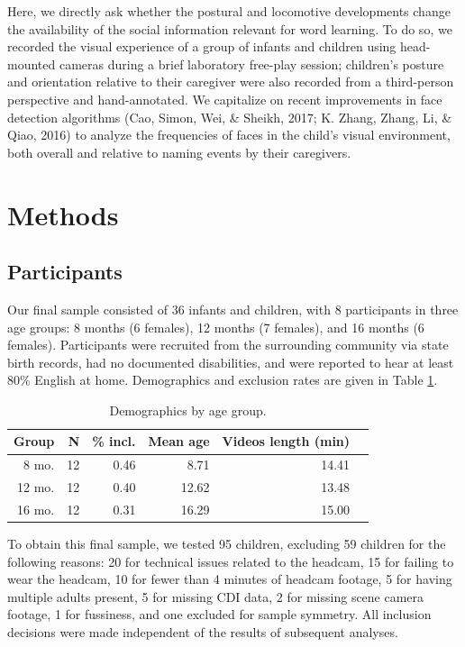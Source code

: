 \documentclass[10pt, letterpaper]{article}
\begin{document}
Here, we directly ask whether the postural and locomotive developments
change the availability of the social information relevant for word
learning. To do so, we recorded the visual experience of a group of
infants and children using head-mounted cameras during a brief
laboratory free-play session; children's posture and orientation
relative to their caregiver were also recorded from a third-person
perspective and hand-annotated. We capitalize on recent improvements in
face detection algorithms (Cao, Simon, Wei, \& Sheikh, 2017; K. Zhang,
Zhang, Li, \& Qiao, 2016) to analyze the frequencies of faces in the
child's visual environment, both overall and relative to naming events
by their caregivers.

\section{Methods}\label{methods}

\subsection{Participants}\label{participants}

Our final sample consisted of 36 infants and children, with 8
participants in three age groups: 8 months (6 females), 12 months (7
females), and 16 months (6 females). Participants were recruited from
the surrounding community via state birth records, had no documented
disabilities, and were reported to hear at least 80\% English at home.
Demographics and exclusion rates are given in Table \ref{tab:pop}.

\begin{table}[H]
\centering
\begin{tabular}{rrrrrr}
  \hline
 Group & N & \% incl. & Mean age & Videos length (min) \\ 
  \hline
   8 mo. &   12 & 0.46 & 8.71 & 14.41 \\ 
   12 mo. &  12 & 0.40 & 12.62 & 13.48 \\ 
   16 mo. &  12 & 0.31 & 16.29 & 15.00\\ 
   \hline
\end{tabular}
\caption{\label{tab:pop} Demographics by age group.}
\end{table}

To obtain this final sample, we tested 95 children, excluding 59
children for the following reasons: 20 for technical issues related to
the headcam, 15 for failing to wear the headcam, 10 for fewer than 4
minutes of headcam footage, 5 for having multiple adults present, 5 for
missing CDI data, 2 for missing scene camera footage, 1 for fussiness,
and one excluded for sample symmetry. All inclusion decisions were made
independent of the results of subsequent analyses.
\end{document}
